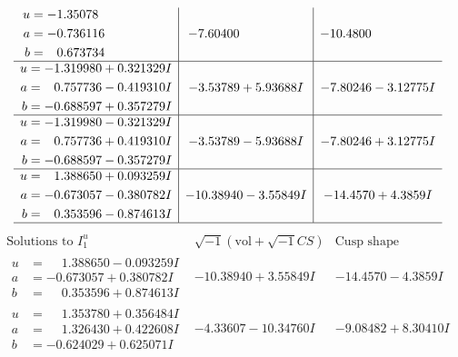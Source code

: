 \documentclass[1p]{elsarticle_modified}
\theoremstyle{definition}
\newcommand{\I}{\sqrt{-1}}
\begin{document}
$$\begin{array}{c|c|c}
\begin{aligned}
u &= -1.35078\phantom{ +0.000000I} \\
a &= -0.736116\phantom{ +0.000000I} \\
b &= \phantom{-}0.673734\phantom{ +0.000000I}\end{aligned}
 & -7.60400\phantom{ +0.000000I} & -10.4800\phantom{ +0.000000I} \\ \hline\begin{aligned}
u &= -1.319980 + 0.321329 I \\
a &= \phantom{-}0.757736 - 0.419310 I \\
b &= -0.688597 + 0.357279 I\end{aligned}
 & -3.53789 + 5.93688 I & -7.80246 - 3.12775 I \\ \hline\begin{aligned}
u &= -1.319980 - 0.321329 I \\
a &= \phantom{-}0.757736 + 0.419310 I \\
b &= -0.688597 - 0.357279 I\end{aligned}
 & -3.53789 - 5.93688 I & -7.80246 + 3.12775 I \\ \hline\begin{aligned}
u &= \phantom{-}1.388650 + 0.093259 I \\
a &= -0.673057 - 0.380782 I \\
b &= \phantom{-}0.353596 - 0.874613 I\end{aligned}
 & -10.38940 - 3.55849 I & -14.4570 + 4.3859 I\\
 \hline 
 \end{array}$$\newpage$$\begin{array}{c|c|c}  
\text{Solutions to }I^u_{1}& \I (\text{vol} + \sqrt{-1}CS) & \text{Cusp shape}\\
 \hline 
\begin{aligned}
u &= \phantom{-}1.388650 - 0.093259 I \\
a &= -0.673057 + 0.380782 I \\
b &= \phantom{-}0.353596 + 0.874613 I\end{aligned}
 & -10.38940 + 3.55849 I & -14.4570 - 4.3859 I \\ \hline\begin{aligned}
u &= \phantom{-}1.353780 + 0.356484 I \\
a &= \phantom{-}1.326430 + 0.422608 I \\
b &= -0.624029 + 0.625071 I\end{aligned}
 & -4.33607 - 10.34760 I & -9.08482 + 8.30410 I \\ \hline\begin{aligned}

\end{aligned}
\end{array}$$
\end{document}
